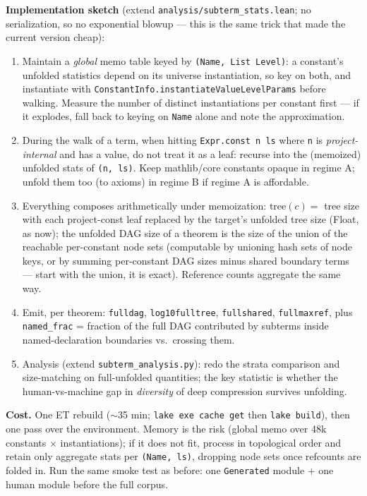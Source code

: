 \documentclass[11pt]{article}
\newcommand{\code}[1]{\texttt{#1}}
\begin{document}
\textbf{Implementation sketch} (extend \code{analysis/subterm\_stats.lean}; no serialization,
so no exponential blowup --- this is the same trick that made the current version cheap):
\begin{enumerate}[leftmargin=1.4em, itemsep=1pt]
\item Maintain a \emph{global} memo table keyed by \code{(Name, List Level)}: a constant's
  unfolded statistics depend on its universe instantiation, so key on both, and instantiate
  with \code{ConstantInfo.instantiateValueLevelParams} before walking. Measure the number of
  distinct instantiations per constant first --- if it explodes, fall back to keying on
  \code{Name} alone and note the approximation.
\item During the walk of a term, when hitting \code{Expr.const n ls} where \code{n} is
  \emph{project-internal} and has a value, do not treat it as a leaf: recurse into the
  (memoized) unfolded stats of \code{(n, ls)}. Keep mathlib/core constants opaque in regime
  A; unfold them too (to axioms) in regime B if regime A is affordable.
\item Everything composes arithmetically under memoization:
  $\mathrm{tree}(c) = $ tree size with each project-const leaf replaced by the target's
  unfolded tree size (Float, as now); the unfolded DAG size of a theorem is the size of the
  union of the reachable per-constant node sets (computable by unioning hash sets of node
  keys, or by summing per-constant DAG sizes minus shared boundary terms --- start with the
  union, it is exact). Reference counts aggregate the same way.
\item Emit, per theorem: \code{fulldag}, \code{log10fulltree}, \code{fullshared},
  \code{fullmaxref}, plus \code{named\_frac} = fraction of the full DAG contributed by
  subterms inside named-declaration boundaries vs.\ crossing them.
\item Analysis (extend \code{subterm\_analysis.py}): redo the strata comparison and
  size-matching on full-unfolded quantities; the key statistic is whether the
  human-vs-machine gap in \emph{diversity} of deep compression survives unfolding.
\end{enumerate}
\textbf{Cost.} One ET rebuild ($\sim$35 min; \code{lake exe cache get} then \code{lake
build}), then one pass over the environment. Memory is the risk (global memo over 48k
constants $\times$ instantiations); if it does not fit, process in topological order and
retain only aggregate stats per \code{(Name, ls)}, dropping node sets once refcounts are
folded in. Run the same smoke test as before: one \code{Generated} module + one human module
before the full corpus.
\end{document}
